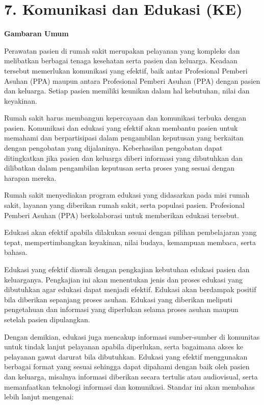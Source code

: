 \documentclass[
]{book}
\begin{document}
\hypertarget{komunikasi-dan-edukasi-ke}{%
\section*{7. Komunikasi dan Edukasi (KE)}\label{komunikasi-dan-edukasi-ke}}

\textbf{Gambaran Umum}

Perawatan pasien di rumah sakit merupakan pelayanan yang kompleks dan melibatkan berbagai tenaga kesehatan serta pasien dan keluarga. Keadaan tersebut memerlukan komunikasi yang efektif, baik antar Profesional Pemberi Asuhan (PPA) maupun antara Profesional Pemberi Asuhan (PPA) dengan pasien dan keluarga. Setiap pasien memiliki keunikan dalam hal kebutuhan, nilai dan keyakinan.

Rumah sakit harus membangun kepercayaan dan komunikasi terbuka dengan pasien. Komunikasi dan edukasi yang efektif akan membantu pasien untuk memahami dan berpartisipasi dalam pengambilan keputusan yang berkaitan dengan pengobatan yang dijalaninya. Keberhasilan pengobatan dapat ditingkatkan jika pasien dan keluarga diberi informasi yang dibutuhkan dan dilibatkan dalam pengambilan keputusan serta proses yang sesuai dengan harapan mereka.

Rumah sakit menyediakan program edukasi yang didasarkan pada misi rumah sakit, layanan yang diberikan rumah sakit, serta populasi pasien. Profesional Pemberi Asuhan (PPA) berkolaborasi untuk memberikan edukasi tersebut.

Edukasi akan efektif apabila dilakukan sesuai dengan pilihan pembelajaran yang tepat, mempertimbangkan keyakinan, nilai budaya, kemampuan membaca, serta bahasa.

Edukasi yang efektif diawali dengan pengkajian kebutuhan edukasi pasien dan keluarganya. Pengkajian ini akan menentukan jenis dan proses edukasi yang dibutuhkan agar edukasi dapat menjadi efektif. Edukasi akan berdampak positif bila diberikan sepanjang proses asuhan. Edukasi yang diberikan meliputi pengetahuan dan informasi yang diperlukan selama proses asuhan maupun setelah pasien dipulangkan.

Dengan demikian, edukasi juga mencakup informasi sumber-sumber di komunitas untuk tindak lanjut pelayanan apabila diperlukan, serta bagaimana akses ke pelayanan gawat darurat bila dibutuhkan. Edukasi yang efektif menggunakan berbagai format yang sesuai sehingga dapat dipahami dengan baik oleh pasien dan keluarga, misalnya informasi diberikan secara tertulis atau audiovisual, serta memanfaatkan teknologi informasi dan komunikasi.
Standar ini akan membahas lebih lanjut mengenai:
\end{document}
